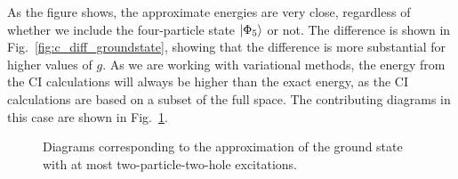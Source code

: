 As the figure shows, the approximate energies are very close, regardless of whether we include the four-particle state $\lvert\Phi_5\rangle$ or not.
The difference is shown in Fig.~\ref{fig:c_diff_groundstate}, showing that the difference is more substantial for higher values of $g$.
As we are working with variational methods, the energy from the CI calculations will always be higher than the exact energy, as the CI calculations are based on a subset of the full space.
The contributing diagrams in this case are shown in Fig.~\ref{fig:2p2h}.

\begin{figure}
    \centering
    
    \caption{
        Diagrams corresponding to the approximation of the ground state with at most two-particle-two-hole excitations.\label{fig:2p2h}
    }
\end{figure}
